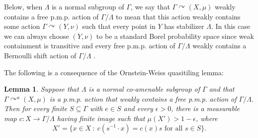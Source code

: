\documentclass[12pt]{amsart}
\newtheorem{lem}[thm]{Lemma}
\theoremstyle{definition}
\newcommand{\pmp}{p{$.$}m{$.$}p{$.$}}
\newcommand{\acts}{\curvearrowright}
\begin{document}
Below, when $\Lambda$ is a normal subgroup of $\Gamma$, we say that $\Gamma\acts (X,\mu)$ weakly contains a free {\pmp} action of $\Gamma/\Lambda$ to mean that this action weakly contains some action $\Gamma\acts (Y,\nu)$ such that every point in $Y$ has stabilizer $\Lambda$. In this case we can always choose $(Y, \nu)$ to be a standard Borel probability space since weak containment is transitive and every free {\pmp} action of $\Gamma / \Lambda$ weakly contains a Bernoulli shift action of $\Gamma / \Lambda$ \cite{AW13}.

The following is a consequence of the Ornstein-Weiss quasitiling lemma:

\begin{lem}\label{OWlemma}
Suppose that $\Lambda$ is a normal co-amenable subgroup of $\Gamma$ and that $\Gamma\acts^a (X,\mu)$ is a {\pmp} action that weakly contains a free {\pmp} action of $\Gamma/\Lambda$.  Then for every finite $S\subseteq \Gamma$ with $e\in S$ and every $\epsilon>0$, there is a measurable map $c:X\to \Gamma/\Lambda$ having finite image such that $\mu(X')>1-\epsilon$, where 
$$X'=\{x\in X \ : \ c(s^{-1}\cdot x)=c(x)s \text{ for all }s\in S\}.$$
\end{lem}
\end{document}
